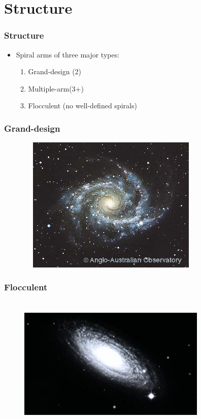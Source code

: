 \documentclass{beamer}
\begin{document}
\section{Structure}

\begin{frame}[t]
\frametitle{Structure}
	\begin{itemize}
	\item<2->Spiral arms of three major types:
		\begin{enumerate}
		\item<3->Grand-design (2)
		\item<4->Multiple-arm(3+)
		\item<5->Flocculent (no well-defined spirals)
		\end{enumerate}
	\end{itemize}
\end{frame}

\begin{frame}
\frametitle{Grand-design}
\begin{figure}
\includegraphics[width=90mm, height=65mm]{grand_design.jpg}
\end{figure}
\end{frame}

\begin{frame}
\frametitle{Flocculent}
\begin{figure}
\includegraphics[width=90mm, height=65mm]{flocculent.jpg}
\end{figure}
\end{frame}
\end{document}
